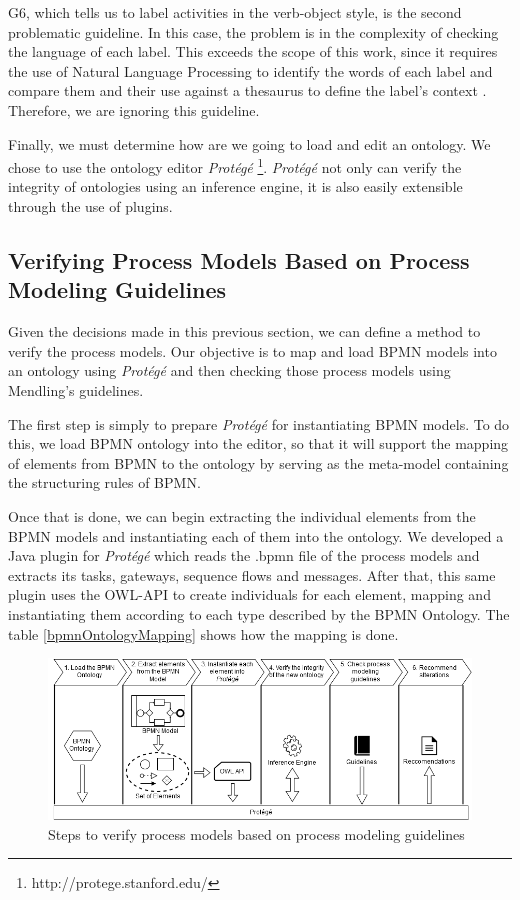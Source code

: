 \documentclass[a4paper,twoside]{article}
\begin{document}
G6, which tells us to label activities in the verb-object style, is the second problematic guideline. In this case, the problem is in the complexity of checking the language of each label. This exceeds the scope of this work, since it requires the use of Natural Language Processing to identify the words of each label and compare them and their use against a thesaurus to define the label's context \cite{Gassen2014}. Therefore, we are ignoring this guideline.



Finally, we must determine how are we going to load and edit an ontology. We chose to use the ontology editor \textit{Protégé} \footnote{http://protege.stanford.edu/}. \textit{Protégé} not only can verify the integrity of ontologies using an inference engine, it is also easily extensible through the use of plugins. %

\subsection{Verifying Process Models Based on Process Modeling Guidelines}
\noindent Given the decisions made in this previous section, we can define a method to verify the process models. Our objective is to map and load BPMN models into an ontology using \textit{Protégé} and then checking those process models using Mendling's guidelines.

The first step is simply to prepare \textit{Protégé} for instantiating BPMN models. To do this, we load BPMN ontology into the editor, so that it will support the mapping of elements from BPMN to the ontology by serving as the meta-model containing the structuring rules of BPMN.

Once that is done, we can begin extracting the individual elements from the BPMN models and instantiating each of them into the ontology. We developed a Java plugin for \textit{Protégé} which reads the .bpmn file of the process models and extracts its tasks, gateways, sequence flows and messages. After that, this same plugin uses the OWL-API to create individuals for each element, mapping and instantiating them according to each type described by the BPMN Ontology. The table \ref{bpmnOntologyMapping} shows how the mapping is done.

\begin{figure}
	\includegraphics[width=\textwidth ]{method.png}
	\caption{Steps to verify process models based on process modeling guidelines}
	\label{methodFigure}
\end{figure}
\end{document}
